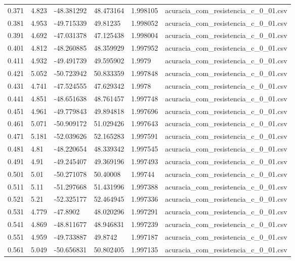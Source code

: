 \begin{table}
\begin{tabular}{llllll}
0.371 & 4.823 & -48.381292 & 48.473164 & 1.998105 & acuracia\_com\_resistencia\_c\_0\_01.csv \\
0.381 & 4.953 & -49.715339 & 49.81235 & 1.998052 & acuracia\_com\_resistencia\_c\_0\_01.csv \\
0.391 & 4.692 & -47.031378 & 47.125438 & 1.998004 & acuracia\_com\_resistencia\_c\_0\_01.csv \\
0.401 & 4.812 & -48.260885 & 48.359929 & 1.997952 & acuracia\_com\_resistencia\_c\_0\_01.csv \\
0.411 & 4.932 & -49.491739 & 49.595902 & 1.9979 & acuracia\_com\_resistencia\_c\_0\_01.csv \\
0.421 & 5.052 & -50.723942 & 50.833359 & 1.997848 & acuracia\_com\_resistencia\_c\_0\_01.csv \\
0.431 & 4.741 & -47.524555 & 47.629342 & 1.9978 & acuracia\_com\_resistencia\_c\_0\_01.csv \\
0.441 & 4.851 & -48.651638 & 48.761457 & 1.997748 & acuracia\_com\_resistencia\_c\_0\_01.csv \\
0.451 & 4.961 & -49.779843 & 49.894818 & 1.997696 & acuracia\_com\_resistencia\_c\_0\_01.csv \\
0.461 & 5.071 & -50.909172 & 51.029426 & 1.997643 & acuracia\_com\_resistencia\_c\_0\_01.csv \\
0.471 & 5.181 & -52.039626 & 52.165283 & 1.997591 & acuracia\_com\_resistencia\_c\_0\_01.csv \\
0.481 & 4.81 & -48.220654 & 48.339342 & 1.997545 & acuracia\_com\_resistencia\_c\_0\_01.csv \\
0.491 & 4.91 & -49.245407 & 49.369196 & 1.997493 & acuracia\_com\_resistencia\_c\_0\_01.csv \\
0.501 & 5.01 & -50.271078 & 50.40008 & 1.99744 & acuracia\_com\_resistencia\_c\_0\_01.csv \\
0.511 & 5.11 & -51.297668 & 51.431996 & 1.997388 & acuracia\_com\_resistencia\_c\_0\_01.csv \\
0.521 & 5.21 & -52.325177 & 52.464945 & 1.997336 & acuracia\_com\_resistencia\_c\_0\_01.csv \\
0.531 & 4.779 & -47.8902 & 48.020296 & 1.997291 & acuracia\_com\_resistencia\_c\_0\_01.csv \\
0.541 & 4.869 & -48.811677 & 48.946831 & 1.997239 & acuracia\_com\_resistencia\_c\_0\_01.csv \\
0.551 & 4.959 & -49.733887 & 49.8742 & 1.997187 & acuracia\_com\_resistencia\_c\_0\_01.csv \\
0.561 & 5.049 & -50.656831 & 50.802405 & 1.997135 & acuracia\_com\_resistencia\_c\_0\_01.csv \\

\end{tabular}
\end{table}
